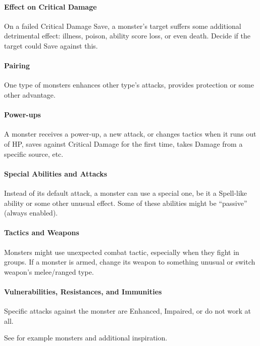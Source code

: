 \documentclass[itdr]{subfiles}
\begin{document}
\vfill
\paragraph{Effect on Critical Damage}
On a failed Critical Damage Save, a monster's target suffers some additional detrimental effect: illness, poison, ability score loss, or even death. Decide if the target could Save against this.

\vfill
\paragraph{Pairing}
One type of monsters enhances other type's attacks, provides protection or some other advantage.

\vfill
\paragraph{Power-ups}
A monster receives a power-up, a new attack, or changes tactics when it runs out of HP, saves against Critical Damage for the first time, takes Damage from a specific source, etc.

\vfill
\paragraph{Special Abilities and Attacks}
Instead of its default attack, a monster can use a special one, be it a Spell-like ability or some other unusual effect. Some of these abilities might be ``passive'' (always enabled).

\vfill
\paragraph{Tactics and Weapons}
Monsters might use unexpected combat tactic, especially when they fight in groups. If a monster is armed, change its weapon to something unusual or switch weapon's melee/ranged type.

\vfill
\paragraph{Vulnerabilities, Resistances, and Immunities}
Specific attacks against the monster are Enhanced, Impaired, or do not work at all.

\vfill
\begin{dbox}
	See \textbf{} for example monsters and additional inspiration.
\end{dbox}
\end{document}
